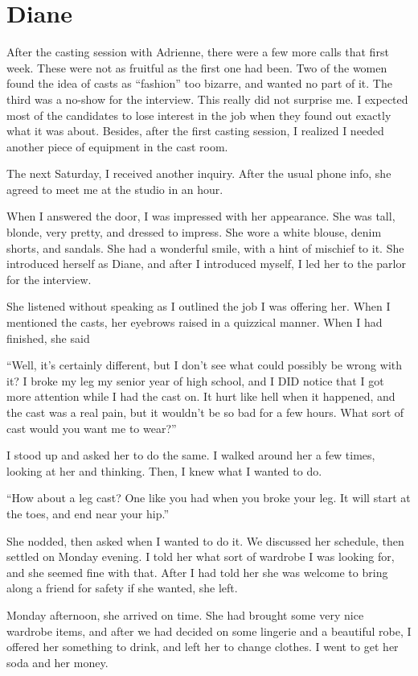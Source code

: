 \chapter{Diane}
After the casting session with Adrienne, there were a few more calls that
first week. These were not as fruitful as the first one had been. Two of the women found the
idea of casts as ``fashion'' too bizarre, and wanted no part of it. The third was a no-show for
the interview. This really did not surprise me. I expected most of the candidates to lose
interest in the job when they found out exactly what it was about. Besides, after the first
casting session, I realized I needed another piece of equipment in the cast room.

The next Saturday, I received another inquiry. After the usual phone info, she agreed to meet me
at the studio in an hour.

When I answered the door, I was impressed with her appearance. She was tall, blonde, very
pretty, and dressed to impress. She wore a white blouse, denim shorts, and sandals. She had a
wonderful smile, with a hint of mischief to it. She introduced herself as Diane, and after I
introduced myself, I led her to the parlor for the interview.

She listened without speaking as I outlined the job I was offering her. When I mentioned the
casts, her eyebrows raised in a quizzical manner. When I had finished, she said

``Well, it's certainly different, but I don't see what could possibly be wrong with it? I broke
my leg my senior year of high school, and I DID notice that I got more attention while I had the
cast on. It hurt like hell when it happened, and the cast was a real pain, but it wouldn't be so
bad for a few hours. What sort of cast would you want me to wear?''

I stood up and asked her to do the same. I walked around her a few times, looking at her and
thinking. Then, I knew what I wanted to do.

``How about a leg cast? One like you had when you broke your leg. It will start at the toes, and
end near your hip.''

She nodded, then asked when I wanted to do it. We discussed her schedule, then settled on Monday
evening. I told her what sort of wardrobe I was looking for, and she seemed fine with that.
After I had told her she was welcome to bring along a friend for safety if she wanted, she left.

Monday afternoon, she arrived on time. She had brought some very nice wardrobe items, and after
we had decided on some lingerie and a beautiful robe, I offered her something to drink, and left
her to change clothes. I went to get her soda and her money.

